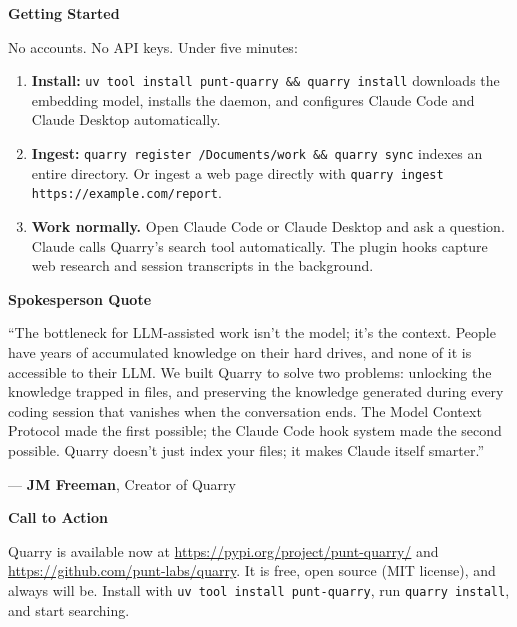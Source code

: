 \documentclass[11pt,letterpaper]{article}
\newcommand{\prsection}[1]{%
  \vspace{1em}%
  {\large\bfseries\color{SectionBlue}#1}%
  \vspace{0.3em}\par%
}
\begin{document}
\prsection{Getting Started}

No accounts. No API keys. Under five minutes:

\begin{enumerate}[leftmargin=2em]
  \item \textbf{Install:} {\small\texttt{uv tool install punt-quarry \&\& quarry install}}
        downloads the embedding model, installs the daemon, and configures
        Claude Code and Claude Desktop automatically.
  \item \textbf{Ingest:} \texttt{quarry register \texttildelow/Documents/work
        \&\& quarry sync} indexes an entire directory. Or ingest a web page
        directly with \texttt{quarry ingest https://example.com/report}.
  \item \textbf{Work normally.} Open Claude Code or Claude Desktop and ask a
        question. Claude calls Quarry's search tool automatically. The plugin
        hooks capture web research and session transcripts in the background.
\end{enumerate}

\prsection{Spokesperson Quote}

\begin{spokespersonquote}
``The bottleneck for LLM-assisted work isn't the model; it's the context. People
have years of accumulated knowledge on their hard drives, and none of it is
accessible to their LLM. We built Quarry to solve two problems: unlocking the
knowledge trapped in files, and preserving the knowledge generated during every
coding session that vanishes when the conversation ends. The Model Context
Protocol made the first possible; the Claude Code hook system made the second
possible. Quarry doesn't just index your files; it makes Claude itself
smarter.''

\raggedleft --- \textbf{JM Freeman}, Creator of Quarry
\end{spokespersonquote}

\prsection{Call to Action}

Quarry is available now at \url{https://pypi.org/project/punt-quarry/} and
\url{https://github.com/punt-labs/quarry}. It is free, open source (MIT
license), and always will be. Install with \texttt{uv tool install punt-quarry},
run \texttt{quarry install}, and start searching.

\newpage

\end{document}
